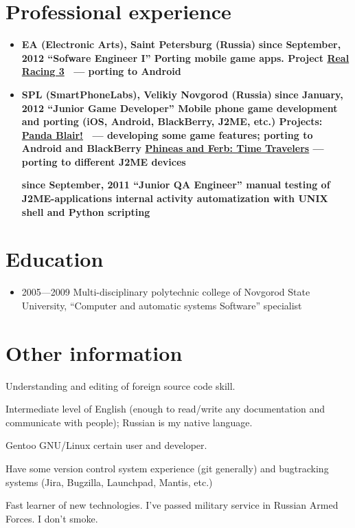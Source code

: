 \section{Professional experience}
\begin{itemize}
\item {
\fontsize{14pt}{14pt}\selectfont
\bfseries EA (Electronic Arts)\mdseries, Saint Petersburg (Russia)
}
\subitem \bfseries since September, 2012 ``Sofware Engineer I''\mdseries
\subsubitem Porting mobile game apps.
\subsubitem Project \href{http://www.facebook.com/realracing}{Real Racing 3} \
--- porting to Android

\item {
\fontsize{14pt}{14pt}\selectfont
\bfseries SPL (SmartPhoneLabs)\mdseries, Velikiy Novgorod (Russia)
}
\subitem \bfseries since January, 2012 ``Junior Game Developer''\mdseries
\subsubitem Mobile phone game development and porting
(iOS, Android, BlackBerry, J2ME, etc.)
\subsubitem Projects:
\subsubitem\href{https://itunes.apple.com/us/app/panda-blair!/id500995558?mt=8}{Panda Blair!} \
--- developing some game features; porting to Android and BlackBerry
\subsubitem\href{http://java.mob.org/game/phineas\_and\_ferb\_time\_travelers.html}{Phineas and Ferb: Time Travelers} --- porting to different J2ME devices

\subitem \bfseries since September, 2011 ``Junior QA Engineer''\mdseries
\subsubitem manual testing of J2ME-applications
\subsubitem internal activity automatization with UNIX shell and Python scripting
\end{itemize}

\section{Education}
\begin{itemize}
\item 2005---2009 Multi-disciplinary polytechnic college of
Novgorod State University,
``Computer and automatic systems Software'' specialist
\end{itemize}

\section{Other information}
Understanding and editing of foreign source code skill.

Intermediate level of English
(enough to read/write any documentation and communicate with people);
Russian is my native language.

Gentoo GNU/Linux certain user and developer.

Have some version control system experience (git generally) and
bugtracking systems (Jira, Bugzilla, Launchpad, Mantis, etc.)

Fast learner of new technologies.
I've passed military service in Russian Armed Forces.
I don't smoke.
